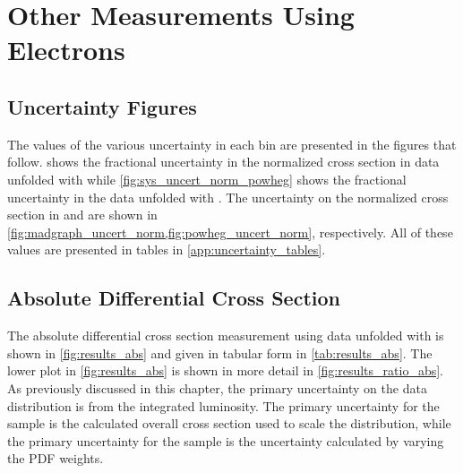 \chapter{Other Measurements Using \Dressed Electrons}
\label{app:dressed_measurements}

\section{Uncertainty Figures}

The values of the various uncertainty in each \phistar bin are presented in the
figures that follow.  shows the fractional
uncertainty in the normalized \phistar cross section in data unfolded with
\MADGRAPH while \cref{fig:sys_uncert_norm_powheg} shows the fractional
uncertainty in the data unfolded with \POWHEG. The uncertainty on the
normalized \phistar cross section in \MADGRAPH and \POWHEG are shown in
\cref{fig:madgraph_uncert_norm,fig:powheg_uncert_norm},
respectively. All of these values are presented in tables in
\cref{app:uncertainty_tables}.











\section{Absolute Differential Cross Section}
\label{sec:results_abs}

The absolute differential cross section measurement using data unfolded with
\MADGRAPH is shown in \cref{fig:results_abs} and given in tabular form in
\cref{tab:results_abs}. The lower plot in \cref{fig:results_abs} is
shown in more detail in \cref{fig:results_ratio_abs}. As previously
discussed in this chapter, the primary uncertainty on the data distribution is
from the integrated luminosity. The primary uncertainty for the
\MADGRAPH sample is the \FEWZ calculated overall cross section used to scale
the distribution, while the primary uncertainty for the \POWHEG sample is the
uncertainty calculated by varying the \CTten PDF weights.

